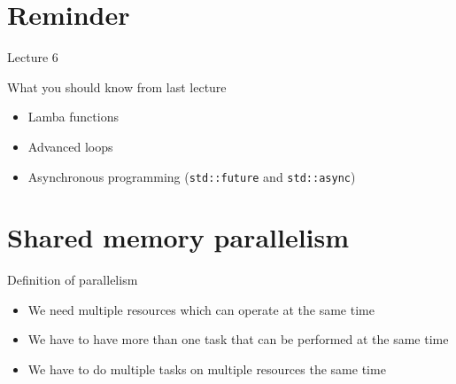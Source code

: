 \documentclass[12pt,t]{beamer}
\title{\coursename}
\subtitle{Lecture 7: Shared memory  parallelism}
\date {
 \tiny \url{\courseurl}
\vspace{2cm}
\doclicenseThis  
  
}
\begin{document}
 {
    \frame {
        \titlepage
    }
}

\frame{

\tableofcontents

}


\section{Reminder}
\begin{frame}{Lecture 6}
\begin{block}{What you should know from last lecture}
\begin{itemize}
\item Lamba functions
\item Advanced loops
\item Asynchronous programming (\lstinline|std::future| and \lstinline|std::async|)
\end{itemize}
\end{block}
\end{frame}

\section{Shared memory parallelism}

\begin{frame}{Definition of parallelism}

\begin{itemize}
\item We need multiple resources which can operate at the same time
\item We have to have more than one task that can be performed at the same time
\item We have to do multiple tasks on multiple resources the same time
\end{itemize}

\end{frame}
\end{document}
